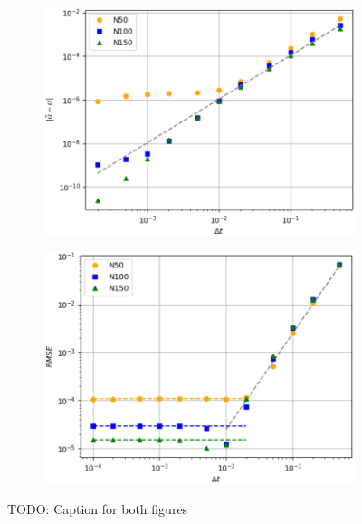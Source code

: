 \documentclass[
  english,        %
  font=times,     %
  onecolumn,      %
]{tumarticle}
\begin{document}
\begin{figure}[!htbp]
    \centering
    \begin{subfigure}[b]{0.49\textwidth}
      \includegraphics[width=\textwidth]{resources/convergence_study_openfoam.png}
      \caption{}
      \label{fig:convergence_openfoam}
    \end{subfigure}
    \hspace{1pt}
    \begin{subfigure}[b]{0.49\textwidth}
        \includegraphics[width=\textwidth]{resources/RMSE_study.png}
      \caption{}
      \label{fig:RMSE_openfoam}
    \end{subfigure}
    \caption{TODO: Caption for both figures}
    \label{fig:figures}
  \end{figure}
  
\end{document}
